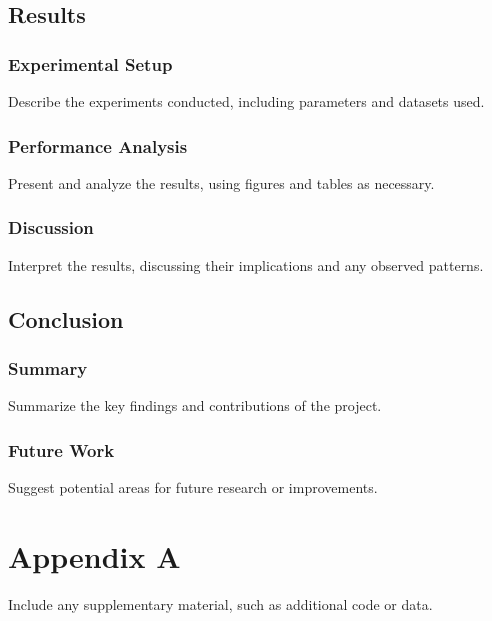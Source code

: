 \documentclass[12pt]{article}
\begin{document}
\section{Results}
\subsection{Experimental Setup}
Describe the experiments conducted, including parameters and datasets used.

\subsection{Performance Analysis}
Present and analyze the results, using figures and tables as necessary.

\subsection{Discussion}
Interpret the results, discussing their implications and any observed patterns.

\section{Conclusion}
\subsection{Summary}
Summarize the key findings and contributions of the project.

\subsection{Future Work}
Suggest potential areas for future research or improvements.

\newpage
\printbibliography

\appendix
\chapter{Appendix A}
Include any supplementary material, such as additional code or data.
\end{document}
